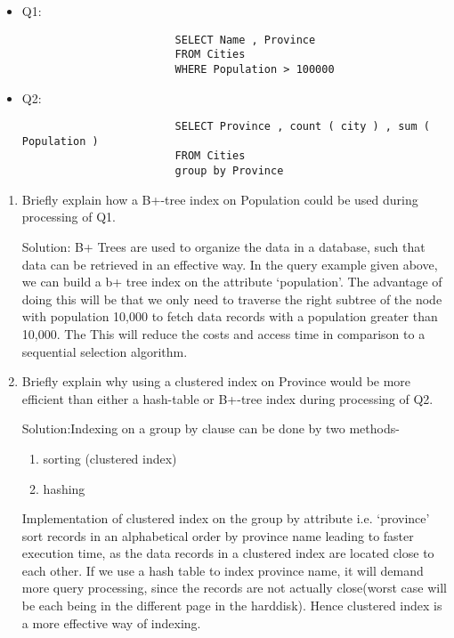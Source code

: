 \documentclass[10pt]{article}
\begin{document}
		\begin{itemize}
			\item Q1:
				\begin{addmargin}[4em]{4em}
					\begin{lstlisting}
						SELECT Name , Province
						FROM Cities
						WHERE Population > 100000
					\end{lstlisting}
				\end{addmargin}
				
			\item Q2:
				\begin{addmargin}[4em]{4em}
					\begin{lstlisting}
						SELECT Province , count ( city ) , sum ( Population )
						FROM Cities
						group by Province
					\end{lstlisting}
				\end{addmargin}
				
		\end{itemize}
	
		\bigskip
		
		\begin{enumerate}
			
		\item Briefly explain how a B+-tree index on Population could be used during processing of Q1.
		
			Solution: B+ Trees are used to organize the data in a database, such that data can be retrieved in an effective 			way. In the query example given above, we can build a b+ tree index on the attribute ‘population’. The advantage 			of doing this will be that we only need to traverse the right subtree of the node with population 10,000 to fetch 			data records with a population greater than 10,000. The This will reduce the costs and access time in comparison 			to a sequential selection algorithm.
		\item Briefly explain why using a clustered index on Province would be more efficient than either a hash-table 			         	or B+-tree index during processing of Q2.
		
		     Solution:Indexing on a group by clause can be done by two methods-
			\begin{enumerate}
			    \item sorting (clustered index)
			    \item hashing
			\end{enumerate}
           
         	Implementation of clustered index on the group by attribute i.e. ‘province’ sort records in an alphabetical order by 			province name leading to faster execution time, as the data records in a clustered index are located close to each 			other. If we use a hash table to index province name, it will demand more query processing, since the records are not 			actually close(worst case will be each being in the different page in the harddisk). Hence clustered index is a more effective way of indexing.

		\end{enumerate}
		
\end{document}
